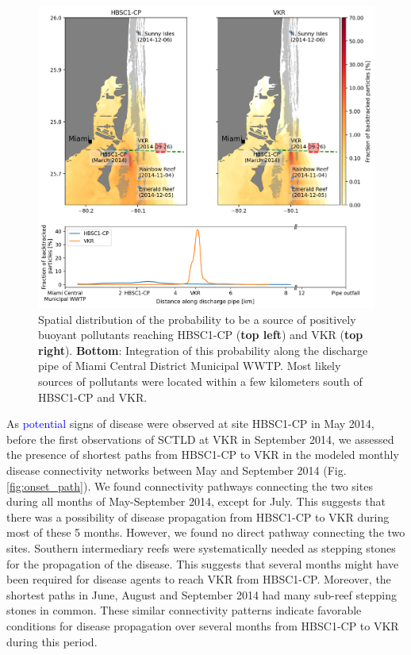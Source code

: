 \documentclass[preprint,12pt,authoryear]{elsarticle}
\newcommand{\modif}[1]{\textcolor{blue}{#1}}
\begin{document}
\begin{figure}
    \centering
    \includegraphics[width=.98\textwidth]{figures/fig_proba_stokes.png}
    \caption{Spatial distribution of the probability to be a source of positively buoyant pollutants reaching HBSC1-CP (\textbf{top left}) and VKR (\textbf{top right}). \textbf{Bottom}: Integration of this probability along the discharge pipe of Miami Central District Municipal WWTP. Most likely sources of pollutants were located within a few kilometers south of HBSC1-CP and VKR.}
    \label{fig:backtrack}
\end{figure}

As \modif{potential} signs of disease were observed at site HBSC1-CP in May 2014, before the first observations of SCTLD at VKR in September 2014, we assessed the presence of shortest paths from HBSC1-CP to VKR in the modeled monthly disease connectivity networks between May and September 2014 (Fig. \ref{fig:onset_path}). We found connectivity pathways connecting the two sites during all months of May-September 2014, except for July. This suggests that there was a possibility of disease propagation from HBSC1-CP to VKR during most of these 5 months. However, we found no direct pathway connecting the two sites. Southern intermediary reefs were systematically needed as stepping stones for the propagation of the disease. This suggests that several months might have been required for disease agents to reach VKR from HBSC1-CP. Moreover, the shortest paths in June, August and September 2014 had many sub-reef stepping stones in common. These similar connectivity patterns indicate favorable conditions for disease propagation over several months from HBSC1-CP to VKR during this period. 
\end{document}
